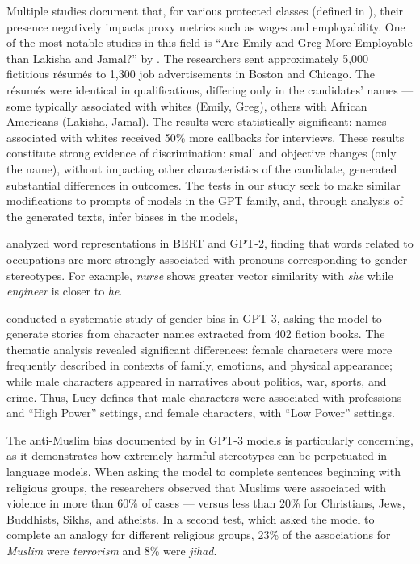 \documentclass[12pt,a4paper]{article}
\begin{document}
Multiple studies document that, for various protected classes
(defined in \citealp{heymann2021}), their presence negatively impacts
proxy metrics such as wages and employability. One of the most
notable studies in this field is ``Are Emily and Greg More Employable than Lakisha
and Jamal?'' by \citet{bertrand2004}. The researchers
sent approximately 5,000 fictitious résumés to 1,300 job
advertisements in Boston and Chicago. The résumés were identical in
qualifications, differing only in the candidates' names --- some
typically associated with whites (Emily, Greg), others with African Americans
(Lakisha, Jamal). The results were statistically significant:
names associated with whites received 50\% more callbacks for
interviews. These results constitute strong evidence of
discrimination: small and objective changes (only the name), without
impacting other characteristics of the candidate, generated
substantial differences in outcomes. The tests in our study seek to make
similar modifications to prompts of models in the GPT family, and, through
analysis of the generated texts, infer biases in the models,

\citet{tan2019} analyzed word representations in BERT and
GPT-2, finding that words related to occupations are more
strongly associated with pronouns corresponding to gender
stereotypes. For example, \textit{nurse} shows greater vector similarity with
\textit{she} while \textit{engineer} is closer to \textit{he}.

\citet{lucy2021} conducted a systematic study of gender bias
in GPT-3, asking the model to generate stories from character names
extracted from 402 fiction books. The thematic analysis
revealed significant differences: female characters were more
frequently described in contexts of family, emotions, and physical
appearance; while male characters appeared in narratives about
politics, war, sports, and crime. Thus, Lucy defines that male characters
were associated with professions and ``High Power'' settings, and
female characters, with ``Low Power'' settings.

The anti-Muslim bias documented by \citet{abid2021} in
GPT-3 models is particularly concerning, as it demonstrates how
extremely harmful stereotypes can be perpetuated in language models. When
asking the model to complete sentences beginning with religious
groups, the researchers observed that Muslims were associated with
violence in more than 60\% of cases --- versus less than 20\% for
Christians, Jews, Buddhists, Sikhs, and atheists. In a second test, which
asked the model to complete an analogy for different
religious groups, 23\% of the associations for \textit{Muslim} were \textit{terrorism} and 8\% were
\textit{jihad}.
\end{document}
